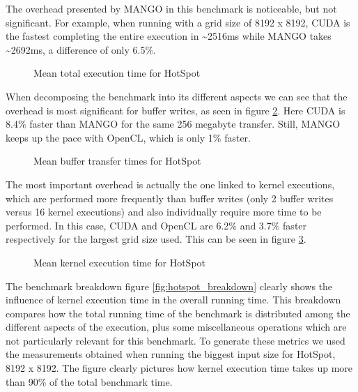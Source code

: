The overhead presented by MANGO in this benchmark is noticeable, but not significant. For example, when running with a grid size of 8192 x 8192, CUDA is the fastest completing the entire execution in \textasciitilde 2516ms while MANGO takes \textasciitilde 2692ms, a difference of only 6.5\%. 

\begin{figure}
    \centering
    \resizebox{!}{180pt}{
        
    }
    \captionsetup{justification=centering}
    \caption{Mean total execution time for HotSpot}
    \label{fig:hotspot_total_duration_mean}
\end{figure}

When decomposing the benchmark into its different aspects we can see that the overhead is most significant for buffer writes, as seen in figure \ref{fig:hotspot_buffer_transfers_mean}. Here CUDA is 8.4\% faster than MANGO for the same 256 megabyte transfer. Still, MANGO keeps up the pace with OpenCL, which is only 1\% faster.

\begin{figure}%
    \centering
    \qquad
    \captionsetup{justification=centering}
    \caption{Mean buffer transfer times for HotSpot}%
    \label{fig:hotspot_buffer_transfers_mean}%
\end{figure}

The most important overhead is actually the one linked to kernel executions, which are performed more frequently than buffer writes (only 2 buffer writes versus 16 kernel executions) and also individually require more time to be performed. In this case, CUDA and OpenCL are 6.2\% and 3.7\% faster respectively for the largest grid size used. This can be seen in figure \ref{fig:hotspot_kernel_executions_mean}.

\begin{figure}
    \centering
    \resizebox{!}{160pt}{
        
    }
    \captionsetup{justification=centering}
    \caption{Mean kernel execution time for HotSpot}
    \label{fig:hotspot_kernel_executions_mean}
\end{figure}

The benchmark breakdown figure \ref{fig:hotspot_breakdown} clearly shows the influence of kernel execution time in the overall running time. This breakdown compares how the total running time of the benchmark is distributed among the different aspects of the execution, plus some miscellaneous operations which are not particularly relevant for this benchmark. To generate these metrics we used the measurements obtained when running the biggest input size for HotSpot, 8192 x 8192. The figure clearly pictures how kernel execution time takes up more than 90\% of the total benchmark time.

